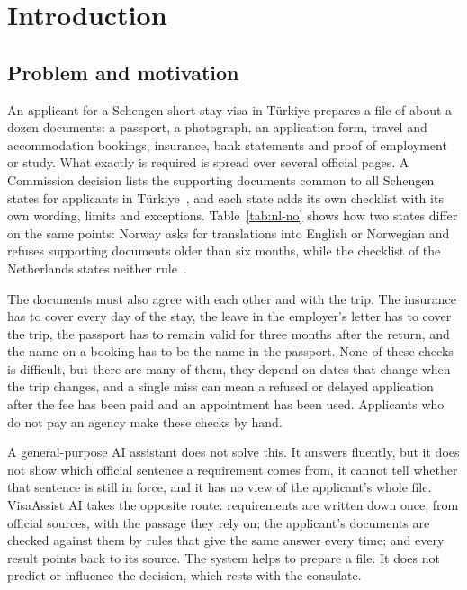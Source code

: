 \chapter{Introduction}\label{ch:intro}

\section{Problem and motivation}
An applicant for a Schengen short-stay visa in Türkiye prepares a file of about a dozen documents:
a passport, a photograph, an application form, travel and accommodation bookings, insurance, bank
statements and proof of employment or study. What exactly is required is spread over several
official pages. A Commission decision lists the supporting documents common to all Schengen
states for applicants in Türkiye~\autocite{eu2021harmonised}, and each state adds its own
checklist with its own wording, limits and exceptions. Table~\ref{tab:nl-no} shows how two states
differ on the same points: Norway asks for translations into English or Norwegian and refuses
supporting documents older than six months, while the checklist of the Netherlands states neither
rule~\autocite{nl2025checklist,no2025checklist}.

The documents must also agree with each other and with the trip. The insurance has to cover every
day of the stay, the leave in the employer's letter has to cover the trip, the passport has to
remain valid for three months after the return, and the name on a booking has to be the name in
the passport. None of these checks is difficult, but there are many of them, they depend on dates
that change when the trip changes, and a single miss can mean a refused or delayed application
after the fee has been paid and an appointment has been used. Applicants who do not pay an agency
make these checks by hand.

A general-purpose AI assistant does not solve this. It answers fluently, but it does not show
which official sentence a requirement comes from, it cannot tell whether that sentence is still in
force, and it has no view of the applicant's whole file. VisaAssist AI takes the opposite route:
requirements are written down once, from official sources, with the passage they rely on; the
applicant's documents are checked against them by rules that give the same answer every time; and
every result points back to its source. The system helps to prepare a file. It does not predict
or influence the decision, which rests with the consulate.

